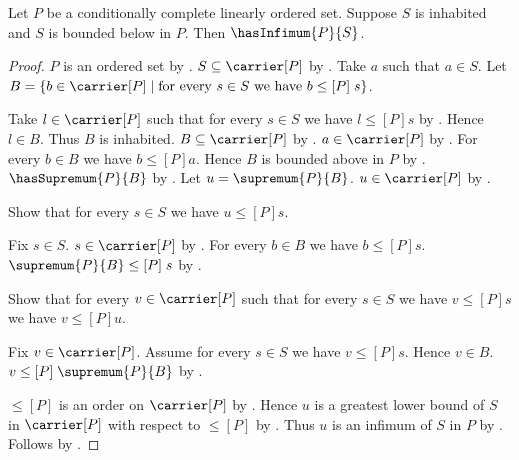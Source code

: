 \begin{theorem}\label{conditionally_complete_has_infimum}
    Let $P$ be a conditionally complete linearly ordered set.
    Suppose $S$ is inhabited and $S$ is bounded below in $P$.
    Then $\hasInfimum{P}{S}$.
\end{theorem}
\begin{proof}
    $P$ is an ordered set by
        .
    $S\subseteq\carrier[P]$ by
        .
    Take $a$ such that $a\in S$.
    Let $B=\{b\in\carrier[P]\mid
        \text{for every $s\in S$ we have $b\mathrel{\leq[P]}s$}\}$.

    Take $l\in\carrier[P]$ such that for every $s\in S$ we have
        $l\mathrel{\leq[P]}s$ by
        .
    Hence $l\in B$.
    Thus $B$ is inhabited.
    $B\subseteq\carrier[P]$ by .
    $a\in\carrier[P]$ by .
    For every $b\in B$ we have $b\mathrel{\leq[P]}a$.
    Hence $B$ is bounded above in $P$ by
        .
    $\hasSupremum{P}{B}$ by
        .
    Let $u=\supremum{P}{B}$.
    $u\in\carrier[P]$ by .

    Show that for every $s\in S$ we have $u\mathrel{\leq[P]}s$.
    \begin{subproof}
        Fix $s\in S$.
        $s\in\carrier[P]$ by .
        For every $b\in B$ we have $b\mathrel{\leq[P]}s$.
        $\supremum{P}{B}\mathrel{\leq[P]}s$ by
            .
    \end{subproof}
    Show that for every $v\in\carrier[P]$ such that
        for every $s\in S$ we have $v\mathrel{\leq[P]}s$ we have
        $v\mathrel{\leq[P]}u$.
    \begin{subproof}
        Fix $v\in\carrier[P]$.
        Assume for every $s\in S$ we have $v\mathrel{\leq[P]}s$.
        Hence $v\in B$.
        $v\mathrel{\leq[P]}\supremum{P}{B}$ by
            .
    \end{subproof}
    $\leq[P]$ is an order on $\carrier[P]$ by
        .
    Hence $u$ is a greatest lower bound of $S$ in $\carrier[P]$
        with respect to $\leq[P]$ by
        .
    Thus $u$ is an infimum of $S$ in $P$ by
        .
    Follows by .
\end{proof}
